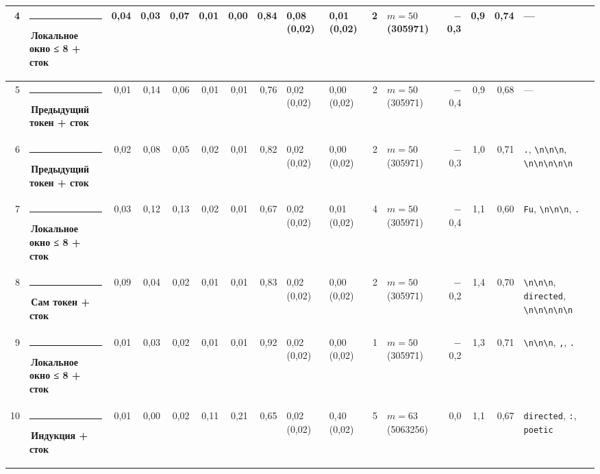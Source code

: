 \documentclass[10pt]{article}
\begin{document}
\begin{minipage}{\linewidth}
\begin{center}
{\begin{tabular}{|r|l|r|r|r|r|r|r|l|l|r|l|r|r|r|l|}
4 & \textcolor[HTML]{1BAF7A}{\rule{0.62em}{0.62em}}\,\textbf{Локальное окно ≤ 8 + сток} & 0,04 & 0,03 & 0,07 & 0,01 & 0,00 & 0,84 & 0,08 (0,02) & 0,01 (0,02) & 2 & $m{=}50$ (305971) & $-$0,3 & 0,9 & 0,74 & — \\ \hline
5 & \textcolor[HTML]{2A78D6}{\rule{0.62em}{0.62em}}\,\textbf{Предыдущий токен + сток} & 0,01 & 0,14 & 0,06 & 0,01 & 0,01 & 0,76 & 0,02 (0,02) & 0,00 (0,02) & 2 & $m{=}50$ (305971) & $-$0,4 & 0,9 & 0,68 & — \\ \hline
6 & \textcolor[HTML]{2A78D6}{\rule{0.62em}{0.62em}}\,\textbf{Предыдущий токен + сток} & 0,02 & 0,08 & 0,05 & 0,02 & 0,01 & 0,82 & 0,02 (0,02) & 0,00 (0,02) & 2 & $m{=}50$ (305971) & $-$0,3 & 1,0 & 0,71 & \texttt{\textvisiblespace{}.}, \texttt{\textvisiblespace{}\textbackslash{}n\textbackslash{}n\textbackslash{}n}, \texttt{\textvisiblespace{}\textbackslash{}n\textbackslash{}n\textbackslash{}n\textbackslash{}n\textbackslash{}n} \\ \hline
7 & \textcolor[HTML]{1BAF7A}{\rule{0.62em}{0.62em}}\,\textbf{Локальное окно ≤ 8 + сток} & 0,03 & 0,12 & 0,13 & 0,02 & 0,01 & 0,67 & 0,02 (0,02) & 0,01 (0,02) & 4 & $m{=}50$ (305971) & $-$0,4 & 1,1 & 0,60 & \texttt{\textvisiblespace{}Fu}, \texttt{\textvisiblespace{}\textbackslash{}n\textbackslash{}n\textbackslash{}n}, \texttt{\textvisiblespace{}.} \\ \hline
8 & \textcolor[HTML]{2A78D6}{\rule{0.62em}{0.62em}}\,\textbf{Сам токен + сток} & 0,09 & 0,04 & 0,02 & 0,01 & 0,01 & 0,83 & 0,02 (0,02) & 0,00 (0,02) & 2 & $m{=}50$ (305971) & $-$0,2 & 1,4 & 0,70 & \texttt{\textvisiblespace{}\textbackslash{}n\textbackslash{}n\textbackslash{}n}, \texttt{\textvisiblespace{}directed}, \texttt{\textvisiblespace{}\textbackslash{}n\textbackslash{}n\textbackslash{}n\textbackslash{}n\textbackslash{}n} \\ \hline
9 & \textcolor[HTML]{1BAF7A}{\rule{0.62em}{0.62em}}\,\textbf{Локальное окно ≤ 8 + сток} & 0,01 & 0,03 & 0,02 & 0,01 & 0,01 & 0,92 & 0,02 (0,02) & 0,00 (0,02) & 1 & $m{=}50$ (305971) & $-$0,2 & 1,3 & 0,71 & \texttt{\textvisiblespace{}\textbackslash{}n\textbackslash{}n\textbackslash{}n}, \texttt{\textvisiblespace{},}, \texttt{\textvisiblespace{}.} \\ \hline
10 & \textcolor[HTML]{008300}{\rule{0.62em}{0.62em}}\,\textbf{Индукция + сток} & 0,01 & 0,00 & 0,02 & 0,11 & 0,21 & 0,65 & 0,02 (0,02) & 0,40 (0,02) & 5 & $m{=}63$ (5063256) & 0,0 & 1,1 & 0,67 & \texttt{\textvisiblespace{}directed}, \texttt{\textvisiblespace{}:}, \texttt{\textvisiblespace{}poetic} \\ \hline

\end{tabular}}
\end{center}
\end{minipage}
\end{document}
